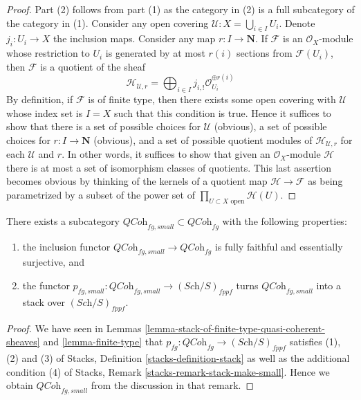 \begin{proof}
Part (2) follows from part (1) as the category in (2) is a full subcategory
of the category in (1). Consider any open covering
$\mathcal{U} : X = \bigcup_{i \in I} U_i$. Denote $j_i : U_i \to X$
the inclusion maps. Consider any map $r : I \to \mathbf{N}$.
If $\mathcal{F}$ is an $\mathcal{O}_X$-module whose restriction to
$U_i$ is generated by at most $r(i)$ sections from $\mathcal{F}(U_i)$,
then $\mathcal{F}$ is a quotient of the sheaf
$$
\mathcal{H}_{\mathcal{U}, r} =
\bigoplus\nolimits_{i \in I} j_{i, !}\mathcal{O}_{U_i}^{\oplus r(i)}
$$
By definition, if $\mathcal{F}$ is of finite type, then there exists
some open covering with $\mathcal{U}$ whose index set is $I = X$
such that this condition is true. Hence it suffices to show that
there is a set of possible choices for $\mathcal{U}$ (obvious),
a set of possible choices for $r : I \to \mathbf{N}$ (obvious), and
a set of possible quotient modules of $\mathcal{H}_{\mathcal{U}, r}$
for each $\mathcal{U}$ and $r$. In other words, it suffices to show
that given an $\mathcal{O}_X$-module $\mathcal{H}$ there is at most
a set of isomorphism classes of quotients.
This last assertion becomes obvious
by thinking of the kernels of a quotient map
$\mathcal{H} \to \mathcal{F}$
as being parametrized by a subset of the power set of
$\prod_{U \subset X\text{ open}} \mathcal{H}(U)$.
\end{proof}

\begin{lemma}
\label{lemma-stack-fg-quasi-coherent}
There exists a subcategory
$\textit{QCoh}_{fg, small} \subset \textit{QCoh}_{fg}$
with the following properties:
\begin{enumerate}
\item the inclusion functor
$\textit{QCoh}_{fg, small} \to \textit{QCoh}_{fg}$ is
fully faithful and essentially surjective, and
\item the functor
$p_{fg, small} : \textit{QCoh}_{fg, small} \to (\textit{Sch}/S)_{fppf}$
turns $\textit{QCoh}_{fg, small}$ into a stack over $(\textit{Sch}/S)_{fppf}$.
\end{enumerate}
\end{lemma}

\begin{proof}
We have seen in
Lemmas \ref{lemma-stack-of-finite-type-quasi-coherent-sheaves} and
\ref{lemma-finite-type}
that $p_{fg} : \textit{QCoh}_{fg} \to (\textit{Sch}/S)_{fppf}$
satisfies (1), (2) and (3) of
Stacks, Definition \ref{stacks-definition-stack}
as well as the additional condition (4) of
Stacks, Remark \ref{stacks-remark-stack-make-small}.
Hence we obtain $\textit{QCoh}_{fg, small}$ from the discussion
in that remark.
\end{proof}

